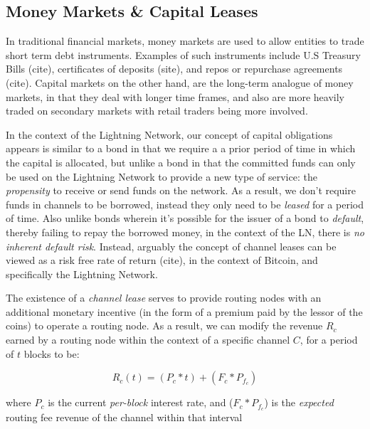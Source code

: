\documentclass[12pt,a4paper]{article}
\theoremstyle{definition}
\begin{document}

\subsection{Money Markets \& Capital Leases} %

In traditional financial markets, money markets are used to allow entities to
trade short term debt instruments. Examples of such instruments include U.S
Treasury Bills (cite), certificates of deposits (site), and repos or repurchase
agreements (cite). Capital markets on the other hand, are the long-term
analogue of money markets, in that they deal with longer time frames, and also
are more heavily traded on secondary markets with retail traders being more
involved. 

In the context of the Lightning Network, our concept of capital obligations
appears is similar to a bond in that we require a a prior period of time in
which the capital is allocated, but unlike a bond in that the committed funds
can only be used on the Lightning Network to provide a new type of service: the
\emph{propensity} to receive or send funds on the network. As a result, we
don't require funds in channels to be borrowed, instead they only need to be
\emph{leased} for a period of time. Also unlike bonds wherein it's possible for
the issuer of a bond to \emph{default}, thereby failing to repay the borrowed
money, in the context of the LN, there is \emph{no inherent default risk}.
Instead, arguably the concept of channel leases can be viewed as a risk free
rate of return (cite), in the context of Bitcoin, and specifically the
Lightning Network. 

The existence of a \emph{channel lease} serves to provide routing nodes with an
additional monetary incentive (in the form of a premium paid by the lessor of
the coins) to operate a routing node. As a result, we can modify the revenue
$R_c$ earned by a routing node within the context of a specific channel $C$,
for a period of $t$ blocks to be: 

\begin{equation}
R_c(t) = (P_c * t) + (F_c* P_{f_c}) %
\end{equation}

where $P_c$ is the current \emph{per-block} interest rate, and ($F_c *
P_{f_c}$) is the \emph{expected} routing fee revenue of the channel within that
interval \\ 
\end{document}
